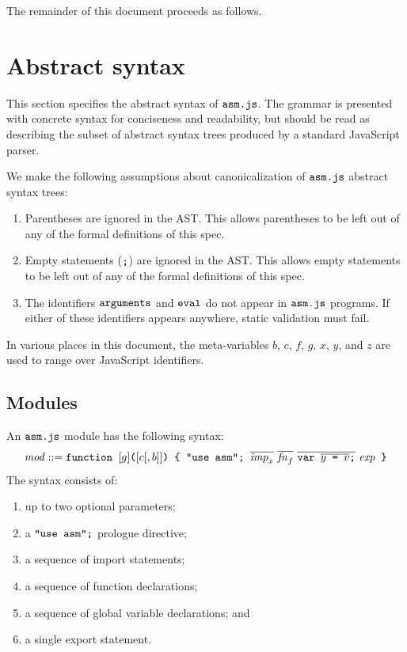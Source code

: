 \documentclass{article}
\newcommand{\seq}[1]{\overline{{#1}}}
\newcommand{\mathjs}[1]{\mbox{\texttt{{#1}}}}
\newcommand{\fun}[3]{\mathjs{function }{#1}\mathjs{(}{#2}\mathjs{) \char123{} }{#3}\mathjs{ \char125{}}}
\newcommand{\var}[1]{\mathjs{var }{#1}\mathjs{;}}
\begin{document}
The remainder of this document proceeds as follows.

\section{Abstract syntax}

This section specifies the abstract syntax of $\mathjs{asm.js}$. The
grammar is presented with concrete syntax for conciseness and
readability, but should be read as describing the subset of abstract
syntax trees produced by a standard JavaScript parser.

We make the following assumptions about canonicalization of
$\mathjs{asm.js}$ abstract syntax trees:
\begin{enumerate}
\item Parentheses are ignored in the AST. This allows parentheses to
  be left out of any of the formal definitions of this spec.

\item Empty statements ($\mathjs{;}$) are ignored in the AST. This
  allows empty statements to be left out of any of the formal
  definitions of this spec.

\item The identifiers $\mathjs{arguments}$ and $\mathjs{eval}$ do not
  appear in $\mathjs{asm.js}$ programs. If either of these identifiers
  appears anywhere, static validation must fail.
\end{enumerate}

In various places in this document, the meta-variables $b$, $c$, $f$,
$g$, $x$, $y$, and $z$ are used to range over JavaScript identifiers.

\subsection{Modules}

An $\mathjs{asm.js}$ module has the following syntax:
\[
\mathit{mod} ::= \fun{[g]}{[c[, b]]}{\mathjs{"use asm"; } \seq{\mathit{imp}_x}\ \seq{\mathit{fn}_f}\ \seq{\var{\seq{y \mathjs{ = } v}}}\ \mathit{exp}}
\]
The syntax consists of:
\begin{enumerate}
\item up to two optional parameters;
\item a $\mathjs{"use asm";}$ prologue directive;
\item a sequence of import statements;
\item a sequence of function declarations;
\item a sequence of global variable declarations; and
\item a single export statement.
\end{enumerate}
\end{document}
